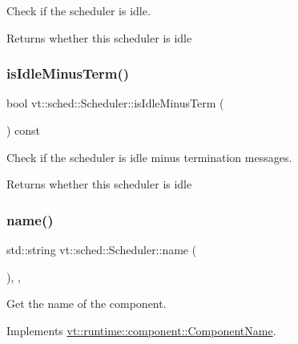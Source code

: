 Check if the scheduler is idle. 

\begin{DoxyReturn}{Returns}
whether this scheduler is idle 
\end{DoxyReturn}
\mbox{\label{structvt_1_1sched_1_1_scheduler_a3229e007ac15bfb1d337428a52157817}} 
\subsubsection{\texorpdfstring{is\+Idle\+Minus\+Term()}{isIdleMinusTerm()}}
{\footnotesize\ttfamily bool vt\+::sched\+::\+Scheduler\+::is\+Idle\+Minus\+Term (\begin{DoxyParamCaption}{ }\end{DoxyParamCaption}) const\hspace{0.3cm}{\ttfamily [inline]}}



Check if the scheduler is idle minus termination messages. 

\begin{DoxyReturn}{Returns}
whether this scheduler is idle 
\end{DoxyReturn}
\mbox{\label{structvt_1_1sched_1_1_scheduler_a60d76cb810df35be76d414226c24d6c4}} 
\subsubsection{\texorpdfstring{name()}{name()}}
{\footnotesize\ttfamily std\+::string vt\+::sched\+::\+Scheduler\+::name (\begin{DoxyParamCaption}{ }\end{DoxyParamCaption})\hspace{0.3cm}{\ttfamily [inline]}, {\ttfamily [override]}, {\ttfamily [virtual]}}



Get the name of the component. 



Implements \hyperlink{structvt_1_1runtime_1_1component_1_1_component_name_a33c06229bb605a2b2ceff68830d6d773}{vt\+::runtime\+::component\+::\+Component\+Name}.

